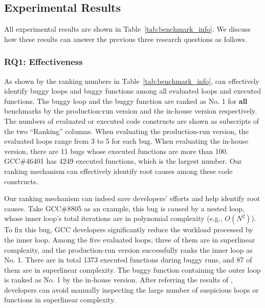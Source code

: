 \subsection{Experimental Results}
\label{sec:results}

All experimental results are shown in Table~\ref{tab:benchmark_info}.
We discuss how these results can answer 
the previous three research questions as follows.

\subsubsection{RQ1: Effectiveness}
As shown by the ranking numbers in Table~\ref{tab:benchmark_info},
\Tool can effectively identify buggy loops and buggy functions 
among all evaluated loops and executed functions.
The buggy loop and the buggy function are ranked as No. 1 for \textbf{all}
benchmarks by the production-run version and the in-house version respectively. 
The numbers of evaluated or executed code constructs are shown as subscripts of 
the two ``Ranking'' columns. 
When evaluating the production-run version, the evaluated loops range from 3 to 5 for each bug.
When evaluating the in-house version, there are 11 bugs whose executed functions are more than 
100.  GCC\#46401 has 4249 executed functions, 
which is the largest number.  
Our ranking mechanism can effectively identify
root causes among these code constructs.


Our ranking mechanism can indeed save developers' efforts 
and help identify root causes. 
Take GCC\#8805 as an example,
this bug is caused by a nested loop, 
whose inner loop's total iterations are in polynomial complexity (e.g., $O(N^2)$).
To fix this bug, GCC developers significantly reduce 
the workload processed by the inner loop. 
Among the five evaluated loops, three of them are in superlinear complexity, 
and the production-run version successfully ranks the inner loop as No. 1.
There are in total 1373 executed functions during buggy runs,
and 87 of them are in superlinear complexity. 
The buggy function containing the outer loop is ranked as No. 1 
by the in-house version. 
After referring the results of \Tool, 
developers can avoid manually inspecting the large number of  
suspicious loops or functions in superlinear complexity. 


